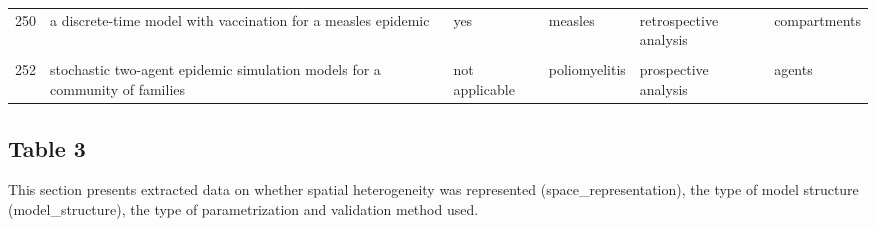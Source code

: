 \documentclass[
]{article}
\begin{document}
\begin{landscape}
\begin{longtable}{l>{\raggedright\arraybackslash}p{3.3cm}l>{\raggedright\arraybackslash}p{3.3cm}>{\raggedright\arraybackslash}p{2cm}l}
250 & a discrete-time model with vaccination for a measles epidemic & yes & measles & retrospective analysis & compartments\\
\addlinespace
\cellcolor{gray!6}{251} & \cellcolor{gray!6}{a stochastic model of epidemics in military recruits} & \cellcolor{gray!6}{yes} & \cellcolor{gray!6}{measles} & \cellcolor{gray!6}{prospective analysis} & \cellcolor{gray!6}{compartments}\\
252 & stochastic two-agent epidemic simulation models for a community of families & not applicable & poliomyelitis & prospective analysis & agents\\*
\end{longtable}
\endgroup{}
\end{landscape}

\hypertarget{table-3}{%
\subsection{Table 3}\label{table-3}}

This section presents extracted data on whether spatial heterogeneity
was represented (space\_representation), the type of model structure
(model\_structure), the type of parametrization and validation method
used.
\end{document}
